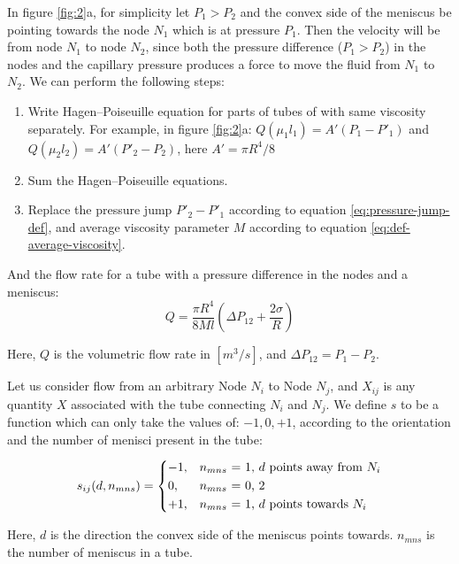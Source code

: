 \documentclass[
	12pt
] {article}
\begin{document}
	In figure \ref{fig:2}a, for simplicity let $P_1 > P_2$ and the convex side of the meniscus be pointing towards the node $N_1$ which is at pressure $P_1$. Then the velocity will be from node $N_1$ to node $N_2$, since both the pressure difference ($P_1 > P_2$) in the nodes and the capillary pressure produces a force to move the fluid from $N_1$ to $N_2$. We can perform the following steps:
	\begin{enumerate}
		\item Write Hagen–Poiseuille equation \cite{sutera1993history} for parts of tubes of with same viscosity separately. For example, in figure \ref{fig:2}a: $Q(\mu_1 l_1) = A' (P_1 - P'_1)$ and $Q(\mu_2 l_2) = A' (P'_2 - P_2)$, here $A' = \pi R^4 / 8$
		\item Sum the Hagen–Poiseuille equations.
		\item Replace the pressure jump $P'_2 - P'_1$ according to equation \ref{eq:pressure-jump-def}, and average viscosity parameter $M$ according to equation \ref{eq:def-average-viscosity}.
	\end{enumerate}
	And the flow rate for a tube with a pressure difference in the nodes and a meniscus:
	\begin{equation} \label{eq:flow-rate-main}
		Q = \frac{\pi R^4}{8Ml} \left( \Delta P_{12} + \frac{2 \sigma}{R} \right)
	\end{equation}
	
	Here, $Q$ is the volumetric flow rate in $[m^3/s]$, and $\Delta P_{12} = P_1 - P_2$.
	
	Let us consider flow from an arbitrary Node $N_i$ to Node $N_j$, and $X_{ij}$ is any quantity $X$ associated with the tube connecting $N_i$ and $N_j$. We define $s$ to be a function which can only take the values of: $-1, 0, +1$, according to the orientation and the number of menisci present in the tube:
	
	\begin{equation}
		s_{ij}(d, n_{mns}) = 
		\begin{dcases}
			-1,&\text{$n_{mns}$ = 1, $d$ points away from $N_{i}$}\\
			0,&\text{$n_{mns}$ = 0, 2}\\
			+1,&\text{$n_{mns}$ = 1, $d$ points towards $N_{i}$}
		\end{dcases}
	\end{equation}

	Here, $d$ is the direction the convex side of the meniscus points towards. $n_{mns}$ is the number of meniscus in a tube.
	
\end{document}
